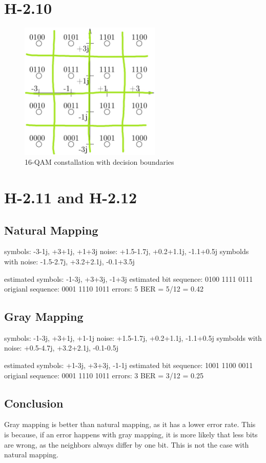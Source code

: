 \documentclass{article}
\begin{document}
\section{H-2.10}

\begin{figure}[h]
\centering
\includegraphics[width=0.6\textwidth]{16qam_decision.jpg}
\caption{16-QAM constallation with decision boundaries}
\label{fig:16qamdecision}
\end{figure}

\section{H-2.11 and H-2.12}
\subsection{Natural Mapping}
symbols: -3-1j, +3+1j, +1+3j
noise: +1.5-1.7j, +0.2+1.1j, -1.1+0.5j
symbolds with noise: -1.5-2.7j, +3.2+2.1j, -0.1+3.5j

estimated symbols: -1-3j, +3+3j, -1+3j
estimated bit sequence: 0100 1111 0111
origianl sequence:      0001 1110 1011
errors: 5
BER = 5/12 = 0.42

\subsection{Gray Mapping}

symbols: -1-3j, +3+1j, +1-1j
noise: +1.5-1.7j, +0.2+1.1j, -1.1+0.5j
symbolds with noise: +0.5-4.7j, +3.2+2.1j, -0.1-0.5j

estimated symbols: +1-3j, +3+3j, -1-1j
estimated bit sequence: 1001 1100 0011
origianl sequence:      0001 1110 1011
errors: 3
BER = 3/12 = 0.25

\subsection{Conclusion}
Gray mapping is better than natural mapping, as it has a lower error rate.
This is because, if an error happens with gray mapping, it is more likely that less bits are wrong, as the neighbors always differ by one bit.
This is not the case with natural mapping.
\end{document}
